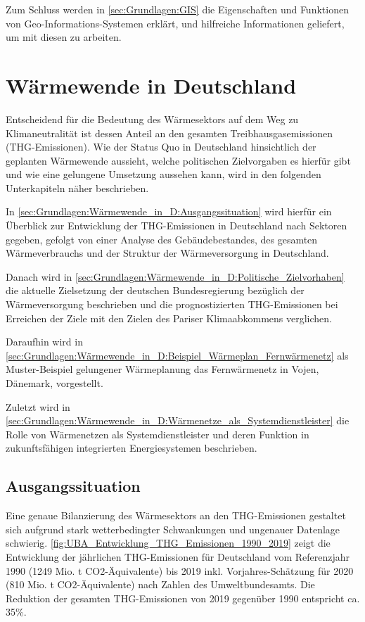 	Zum Schluss werden in \autoref{sec:Grundlagen:GIS} die Eigenschaften und Funktionen von Geo-Informations-Systemen erklärt, und hilfreiche Informationen geliefert, um mit diesen zu arbeiten.
	
	\section{Wärmewende in Deutschland}
	\label{sec:Grundlagen:Wärmewende_in_D}
		Entscheidend für die Bedeutung des Wärmesektors auf dem Weg zu Klimaneutralität ist dessen Anteil an den gesamten Treibhausgasemissionen (THG-Emissionen). Wie der Status Quo in Deutschland hinsichtlich der geplanten Wärmewende aussieht, welche politischen Zielvorgaben es hierfür gibt und wie eine gelungene Umsetzung aussehen kann, wird in den folgenden Unterkapiteln näher beschrieben.
		
		In \autoref{sec:Grundlagen:Wärmewende_in_D:Ausgangssituation} wird hierfür ein Überblick zur Entwicklung der THG-Emissionen in Deutschland nach Sektoren gegeben, gefolgt von einer Analyse des Gebäudebestandes, des gesamten Wärmeverbrauchs und der Struktur der Wärmeversorgung in Deutschland. 
		
		Danach wird in \autoref{sec:Grundlagen:Wärmewende_in_D:Politische_Zielvorhaben} die aktuelle Zielsetzung der deutschen Bundesregierung bezüglich der Wärmeversorgung beschrieben und die prognostizierten THG-Emissionen bei Erreichen der Ziele mit den Zielen des Pariser Klimaabkommens verglichen.
		
		Daraufhin wird in \autoref{sec:Grundlagen:Wärmewende_in_D:Beispiel_Wärmeplan_Fernwärmenetz} als Muster-Beispiel gelungener Wärmeplanung das Fernwärmenetz in Vojen, Dänemark, vorgestellt. 
		
		Zuletzt wird in \autoref{sec:Grundlagen:Wärmewende_in_D:Wärmenetze_als_Systemdienstleister} die Rolle von Wärmenetzen als Systemdienstleister und deren Funktion in zukunftsfähigen integrierten Energiesystemen beschrieben. 
		
		\subsection{Ausgangssituation}
		\label{sec:Grundlagen:Wärmewende_in_D:Ausgangssituation}
			
			Eine genaue Bilanzierung des Wärmesektors an den THG-Emissionen gestaltet sich aufgrund stark wetterbedingter Schwankungen und ungenauer Datenlage schwierig.  \autoref{fig:UBA_Entwicklung_THG_Emissionen_1990_2019} zeigt die Entwicklung der jährlichen THG-Emissionen für Deutschland vom Referenzjahr 1990 (1249 Mio. t CO2-Äquivalente) bis 2019 inkl. Vorjahres-Schätzung für 2020 (810 Mio. t CO2-Äquivalente) nach Zahlen des Umweltbundesamts. Die Reduktion der gesamten THG-Emissionen von 2019 gegenüber 1990 entspricht ca. 35\%.
			\cite{Umweltbundesamt_Treibhausgasemissionen_Deutschland_seit_1990}
			
